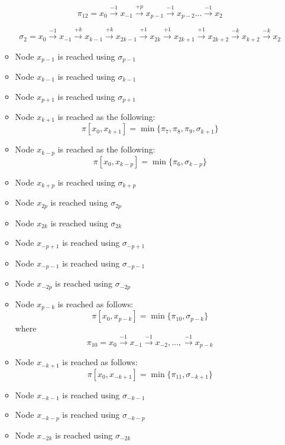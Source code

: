\begin{itemize}
\begin{itemize}
$$\pi_{12}= x_{0} \xrightarrow {-1} x_{-1} \xrightarrow {+p} x_{p-1} \xrightarrow {-1}  x_{p-2} ... \xrightarrow {-1}  x_{2}$$ 

$$\sigma_{2}=x_{0} \xrightarrow {-1} x_{-1} \xrightarrow {+k} x_{k-1} \xrightarrow {+k} x_{2k-1} \xrightarrow {+1} x_{2k}  \xrightarrow {+1} x_{2k+1} \xrightarrow {+1} x_{2k+2} \xrightarrow {-k} x_{k+2} \xrightarrow {-k} x_{2}$$

\item Node $x_{p-1}$ is reached using $\sigma_{p-1}$ 

\item Node $x_{k-1}$ is reached using $\sigma_{k-1}$ 

\item Node $x_{p+1}$ is reached using $\sigma_{p+1}$ 


\item Node $x_{k+1}$ is reached as the following:  
$$ \pi[x_0,x_{k+1}] = \min \{ \pi_7,\pi_8,\pi_9,\sigma_{k+1}\}$$

\item Node $x_{k-p}$ is reached as the following:  
$$ \pi[x_0,x_{k-p}] = \min \{ \pi_6,\sigma_{k-p}\}$$

\item Node $x_{k+p}$ is reached using $\sigma_{k+p}$ 

\item Node $x_{2p}$ is reached using $\sigma_{2p}$ 

\item Node $x_{2k}$ is reached using $\sigma_{2k}$ 

\item Node $x_{-p+1}$ is reached using $\sigma_{-p+1}$ 

\item Node $x_{-p-1}$ is reached using $\sigma_{-p-1}$ 

\item Node $x_{-2p}$ is reached using $\sigma_{-2p}$ 

\item Node $x_{p-k}$ is reached as follows:  
$$ \pi[x_0,x_{p-k}] = \min \{ \pi_{10},\sigma_{p-k}\}$$
where
$$\pi_{10}= x_{0}\xrightarrow {-1} x_{-1}\xrightarrow {-1} x_{-2} ,...,\xrightarrow {-1} x_{p-k}$$

\item Node $x_{-k+1}$ is reached as follows:
$$ \pi[x_0,x_{-k+1}] = \min \{ \pi_{11},\sigma_{-k+1}\}$$

\item Node $x_{-k-1}$ is reached using $\sigma_{-k-1}$ 


\item Node $x_{-k-p}$ is reached using $\sigma_{-k-p}$ 

\item Node $x_{-2k}$ is reached using $\sigma_{-2k}$ 


\end{itemize}

\end{itemize}

